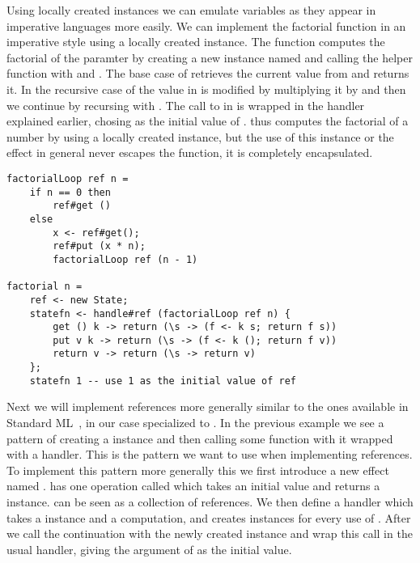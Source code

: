 Using locally created instances we can emulate variables as they appear in imperative languages more easily.
We can implement the factorial function in an imperative style using a locally created  instance.
The  function computes the factorial of the paramter  by creating a new  instance named  and calling the helper function  with  and .
The base case of  retrieves the current value from  and returns it.
In the recursive case of  the value in  is modified by multiplying it by  and then we continue by recursing with .
The call to  in  is wrapped in the  handler explained earlier, chosing  as the initial value of .
 thus computes the factorial of a number by using a locally created instance, but the use of this instance or the  effect in general never escapes the function, it is completely encapsulated.

\pagebreak
\begin{verbatim}
factorialLoop ref n =
	if n == 0 then
		ref#get ()
	else
		x <- ref#get();
		ref#put (x * n);
		factorialLoop ref (n - 1) 

factorial n =
	ref <- new State;
	statefn <- handle#ref (factorialLoop ref n) {
		get () k -> return (\s -> (f <- k s; return f s))
		put v k -> return (\s -> (f <- k (); return f v))
		return v -> return (\s -> return v)
	};
	statefn 1 -- use 1 as the initial value of ref
\end{verbatim}

Next we will implement references more generally similar to the ones available in Standard ML~\autocite{standardml}, in our case specialized to .
In the previous example we see a pattern of creating a  instance and then calling some function with it wrapped with a handler.
This is the pattern we want to use when implementing references.
To implement this pattern more generally this we first introduce a new effect named .
 has one operation called  which takes an initial value  and returns a  instance.
 can be seen as a collection of references.
We then define a handler  which takes a  instance and a computation, and creates  instances for every use of . After we call the continuation with the newly created instance and wrap this call in the usual  handler, giving the argument of  as the initial value.

